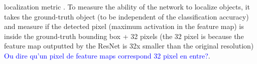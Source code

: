 \documentclass[letterpaper, 10 pt, conference]{ieeeconf}  %
\newcommand{\phil}[1]{\textcolor{blue}{#1}}
\begin{document}
localization metric \cite{oquab2015object}. To measure the ability of the network to localize objects, it takes the ground-truth object (to be independent of the classification accuracy) and measure if the detected pixel (maximum activation in the feature map) is inside the ground-truth bounding box + 32 pixels (the 32 pixel is because the feature map outputted by the ResNet is 32x smaller than the original resolution) \phil{Ou dire qu'un pixel de feature maps correspond  32 pixel en entre?}. %
\end{document}
